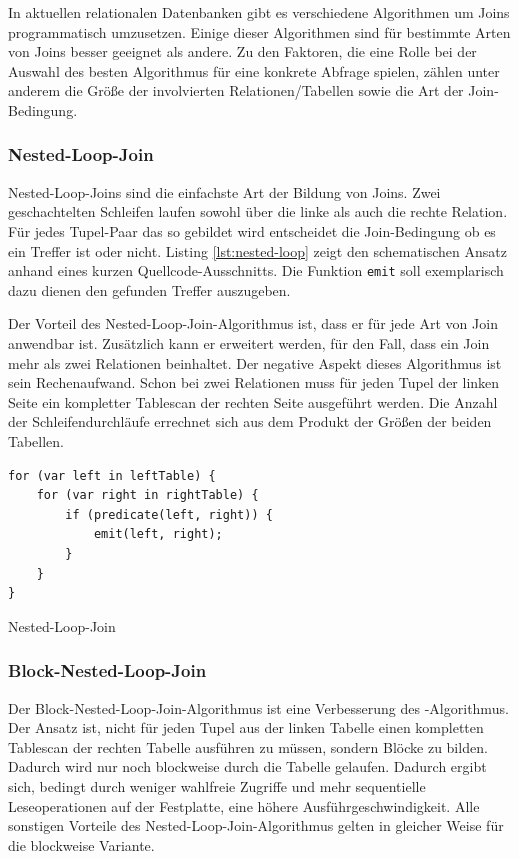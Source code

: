 \documentclass[a4paper]{article}
\begin{document}
In aktuellen relationalen Datenbanken gibt es verschiedene Algorithmen um Joins programmatisch umzusetzen. Einige dieser Algorithmen sind für bestimmte Arten von Joins besser geeignet als andere. Zu den Faktoren, die eine Rolle bei der Auswahl des besten Algorithmus für eine konkrete Abfrage spielen, zählen unter anderem die Größe der involvierten Relationen/Tabellen sowie die Art der Join-Bedingung.

\subsubsection{Nested-Loop-Join}
\label{sec:nested-loop}
Nested-Loop-Joins sind die einfachste Art der Bildung von Joins. Zwei geschachtelten Schleifen laufen sowohl über die linke als auch die rechte Relation. Für jedes Tupel-Paar das so gebildet wird entscheidet die Join-Bedingung ob es ein Treffer ist oder nicht. Listing \ref{lst:nested-loop} zeigt den schematischen Ansatz anhand eines kurzen Quellcode-Ausschnitts. Die Funktion \texttt{emit} soll exemplarisch dazu dienen den gefunden Treffer auszugeben.

Der Vorteil des Nested-Loop-Join-Algorithmus ist, dass er für jede Art von Join anwendbar ist. Zusätzlich kann er erweitert werden, für den Fall, dass ein Join mehr als zwei Relationen beinhaltet. Der negative Aspekt dieses Algorithmus ist sein Rechenaufwand. Schon bei zwei Relationen muss für jeden Tupel der linken Seite ein kompletter Tablescan der rechten Seite ausgeführt werden. Die Anzahl der Schleifendurchläufe errechnet sich aus dem Produkt der Größen der beiden Tabellen.

\begin{listing}[H]
\begin{verbatim}
for (var left in leftTable) {
    for (var right in rightTable) {
        if (predicate(left, right)) {
            emit(left, right);
        }
    }
}
\end{verbatim}
\caption{Nested-Loop-Join}
\label{lst:nested-loop}
\end{listing}

\subsubsection{Block-Nested-Loop-Join}
Der Block-Nested-Loop-Join-Algorithmus ist eine Verbesserung des -Algorithmus. Der Ansatz ist, nicht für jeden Tupel aus der linken Tabelle einen kompletten Tablescan der rechten Tabelle ausführen zu müssen, sondern Blöcke zu bilden. Dadurch wird nur noch blockweise durch die Tabelle gelaufen. Dadurch ergibt sich, bedingt durch weniger wahlfreie Zugriffe und mehr sequentielle Leseoperationen auf der Festplatte, eine höhere Ausführgeschwindigkeit. Alle sonstigen Vorteile des Nested-Loop-Join-Algorithmus gelten in gleicher Weise für die blockweise Variante.
\end{document}
